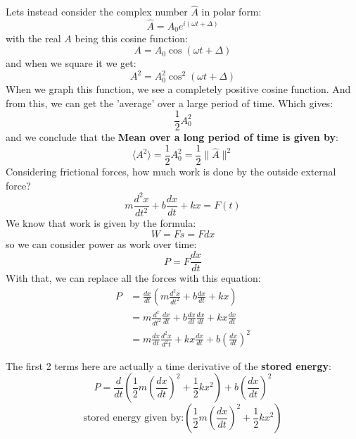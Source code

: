 \documentclass[10pt]{report}
\begin{document}
{{{	Lets instead consider the complex number $\hat{A}$ in polar form: \[
		\hat{A}=A_{0}e^{i\left(\omega t+\Delta\right)}
	\] with the real $A$ being this cosine function:  \[
	A=A_{0}\cos\left(\omega t+\Delta\right)
	\] and when we square it we get: \[
	A^{2}=A_{0}^{2}\cos^{2}\left(\omega t+\Delta\right)
	\] When we graph this function, we see a completely positive cosine function. And from this, we can get the 'average' over a large period of time. Which gives: \[
	\frac{1}{2}A_{0}^{2}
	\] and we conclude that the \textbf{Mean over a long period of time is given by}: \[
	\langle A^{2}\rangle=\frac{1}{2}A_{0}^{2} =\frac{1}{2}\|\hat{A}\|^{2}
	\] 
Considering frictional forces, how much work is done by the outside external force? \[
m\frac{d^{2}x}{dt^{2}}+b\frac{dx}{dt}+kx=F\left(t\right)
\] We know that work is given by the formula: \[
W=Fs=Fdx
\] so we can consider power as work over time: \[
P=F\frac{dx}{dt}
\] With that, we can replace all the forces with this equation: } 
\begin{align*}
	P&=\frac{dx}{dt}\left(m\frac{d^{2}x}{dt^{2}}+b\frac{dx}{dt}+kx\right) \\
	 &=m\frac{d^{x}}{dt^{2}}\frac{dx}{dt} +b\frac{dx}{dt}\frac{dx}{dt}+kx\frac{dx}{dt} \\
	 &=m\frac{dx}{dt}\frac{d^{2}x}{d^{2}t}+kx\frac{dx}{dt}+b\left(\frac{dx}{dt}\right)^{2}
\end{align*}
\par{The first 2 terms here are actually a time derivative of the \textbf{stored energy}: \[
P=\frac{d}{dt}\left(\frac{1}{2}m\left(\frac{dx}{dt}\right)^{2}+\frac{1}{2}kx^{2}\right)+b\left(\frac{dx}{dt}\right)^{2}
\] \[
\text{stored energy given by:} \left(\frac{1}{2}m\left(\frac{dx}{dt}\right)^{2}+\frac{1}{2}kx^{2}\right)
\] 

}}}
\end{document}
